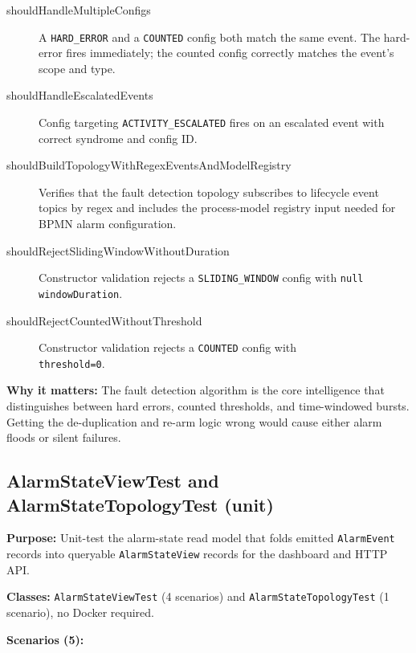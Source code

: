 \begin{description}
\item[shouldHandleMultipleConfigs] A \texttt{HARD\_ERROR} and a
\texttt{COUNTED} config both match the same event. The hard-error
fires immediately; the counted config correctly matches the event's
scope and type.

\item[shouldHandleEscalatedEvents] Config targeting
\texttt{ACTIVITY\_ESCALATED} fires on an escalated event with correct
syndrome and config ID.

\item[shouldBuildTopologyWithRegexEventsAndModelRegistry] Verifies that the
fault detection topology subscribes to lifecycle event topics by regex and
includes the process-model registry input needed for BPMN alarm configuration.

\item[shouldRejectSlidingWindowWithoutDuration] Constructor validation
rejects a \texttt{SLIDING\_WINDOW} config with \texttt{null}
\texttt{windowDuration}.

\item[shouldRejectCountedWithoutThreshold] Constructor validation
rejects a \texttt{COUNTED} config with \\ \texttt{threshold=0}.

\end{description}

\textbf{Why it matters:} The fault detection algorithm is the core
intelligence that distinguishes between hard errors, counted thresholds,
and time-windowed bursts. Getting the de-duplication and re-arm logic
wrong would cause either alarm floods or silent failures.


\subsection{AlarmStateViewTest and AlarmStateTopologyTest (unit)}
\label{it:alarmState}

\textbf{Purpose:} Unit-test the alarm-state read model that folds emitted
\texttt{AlarmEvent} records into queryable \texttt{AlarmStateView} records for
the dashboard and HTTP API.

\textbf{Classes:} \texttt{AlarmStateViewTest} (4 scenarios) and
\texttt{AlarmStateTopologyTest} (1 scenario), no Docker required.

\textbf{Scenarios (5):}


